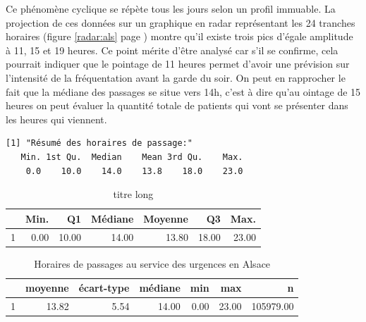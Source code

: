 \documentclass[12pt,english,french]{report}\usepackage{graphicx, color}
\makeatletter
\newenvironment{kframe}{%
 \def\at@end@of@kframe{}%
 \ifinner\ifhmode%
  \def\at@end@of@kframe{\end{minipage}}%
  \begin{minipage}{\columnwidth}%
 \fi\fi%
 \def\FrameCommand##1{\hskip\@totalleftmargin \hskip-\fboxsep
 \colorbox{shadecolor}{##1}\hskip-\fboxsep
     \hskip-\linewidth \hskip-\@totalleftmargin \hskip\columnwidth}%
 \MakeFramed {\advance\hsize-\width
   \@totalleftmargin\z@ \linewidth\hsize
   \@setminipage}}%
 {\par\unskip\endMakeFramed%
 \at@end@of@kframe}
\newenvironment{knitrout}{}{} %
\makeatother
\begin{document}
Ce phénomène cyclique se répète tous les jours selon un profil immuable. La projection de ces données sur un graphique en radar représentant les 24 tranches horaires (figure \ref{radar:als} page \pageref{radar:als}) montre qu'il existe trois pics d'égale amplitude à 11, 15 et 19 heures. Ce point mérite d'être analysé car s'il se confirme, cela pourrait indiquer que le pointage de 11 heures permet d'avoir une prévision sur l'intensité de la fréquentation avant la garde du soir. On peut en rapprocher le fait que la médiane des passages se situe vers 14h, c'est à dire qu'au ointage de 15 heures on peut évaluer la quantité totale de patients qui vont se présenter dans les heures qui viennent.

\begin{knitrout}
\color{fgcolor}\begin{kframe}
\begin{verbatim}
[1] "Résumé des horaires de passage:"
   Min. 1st Qu.  Median    Mean 3rd Qu.    Max. 
    0.0    10.0    14.0    13.8    18.0    23.0 
\end{verbatim}
\end{kframe}
\end{knitrout}


\begin{table}[ht]
\centering
\begin{tabular}{rrrrrrr}
\hline
& Min. & Q1 & Médiane & Moyenne & Q3 & Max. \\
\hline
1 & 0.00 & 10.00 & 14.00 & 13.80 & 18.00 & 23.00 \\
\hline
\end{tabular}
\caption[titre court]{titre long}
\label{lab}
\end{table}


\begin{table}[ht]
\centering
\begin{tabular}{rrrrrrr}
\hline
& moyenne & écart-type & médiane & min & max & n \\
\hline
1 & 13.82 & 5.54 & 14.00 & 0.00 & 23.00 & 105979.00 \\
\hline
\end{tabular}
\caption[Horaires de passage]{Horaires de passages au service des urgences en Alsace}
\label{hor:pass}
\end{table}
\end{document}
